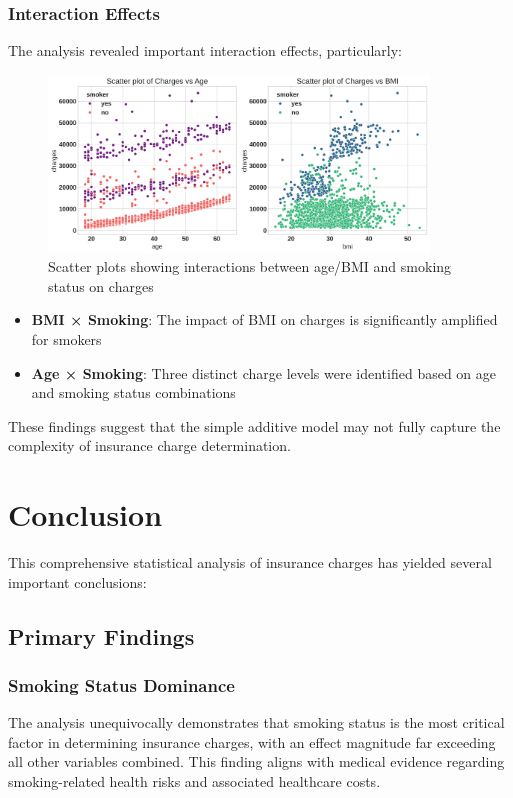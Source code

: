 \documentclass[12pt,a4paper]{article}
\begin{document}
\subsubsection{Interaction Effects}

The analysis revealed important interaction effects, particularly:

\begin{figure}[H]
\centering
\includegraphics[width=0.9\textwidth]{scatter_plots_charges_vs_age_bmi.png}
\caption{Scatter plots showing interactions between age/BMI and smoking status on charges}
\label{fig:scatter_plots_charges_vs_age_bmi}
\end{figure}

\begin{itemize}
    \item \textbf{BMI × Smoking}: The impact of BMI on charges is significantly amplified for smokers
    \item \textbf{Age × Smoking}: Three distinct charge levels were identified based on age and smoking status combinations
\end{itemize}

These findings suggest that the simple additive model may not fully capture the complexity of insurance charge determination.

\section{Conclusion}

This comprehensive statistical analysis of insurance charges has yielded several important conclusions:

\subsection{Primary Findings}

\subsubsection{Smoking Status Dominance}
The analysis unequivocally demonstrates that smoking status is the most critical factor in determining insurance charges, with an effect magnitude far exceeding all other variables combined. This finding aligns with medical evidence regarding smoking-related health risks and associated healthcare costs.
\end{document}
